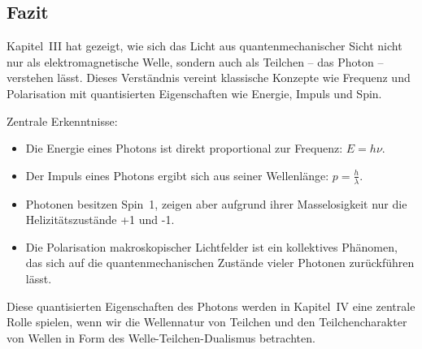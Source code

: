 \subsection{Fazit }

Kapitel~III hat gezeigt, wie sich das Licht aus quantenmechanischer Sicht nicht nur als elektromagnetische Welle, sondern auch als Teilchen -- das Photon -- verstehen lässt. Dieses Verständnis vereint klassische Konzepte wie Frequenz und Polarisation mit quantisierten Eigenschaften wie Energie, Impuls und Spin.

\vspace{0.5em}
Zentrale Erkenntnisse:
\begin{itemize}
	\item Die Energie eines Photons ist direkt proportional zur Frequenz: \( E = h\nu \).
	\item Der Impuls eines Photons ergibt sich aus seiner Wellenlänge: \( p = \frac{h}{\lambda} \).
	\item Photonen besitzen Spin~1, zeigen aber aufgrund ihrer Masselosigkeit nur die Helizitätszustände +1 und -1.
	\item Die Polarisation makroskopischer Lichtfelder ist ein kollektives Phänomen, das sich auf die quantenmechanischen Zustände vieler Photonen zurückführen lässt.
\end{itemize}

\vspace{0.5em}
Diese quantisierten Eigenschaften des Photons werden in Kapitel~IV eine zentrale Rolle spielen, wenn wir die Wellennatur von Teilchen und den Teilchencharakter von Wellen in Form des Welle-Teilchen-Dualismus betrachten.
